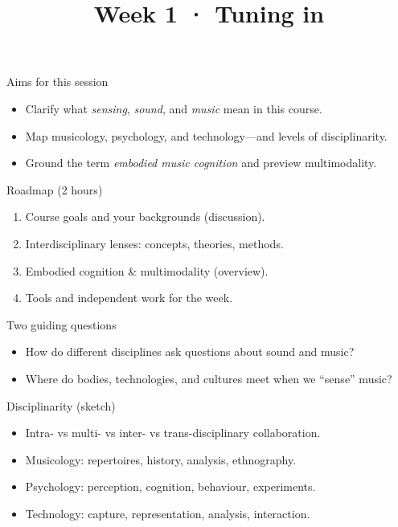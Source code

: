 \documentclass[aspectratio=169]{beamer}
\title{Week 1 · Tuning in}
\subtitle{\coursename}
\author{}
\institute{\instituteuo}
\date{}
\begin{document}
\begin{frame}
  \titlepage
\end{frame}

\begin{frame}{Aims for this session}
  \begin{itemize}
    \item Clarify what \emph{sensing}, \emph{sound}, and \emph{music} mean in this course.
    \item Map musicology, psychology, and technology—and levels of disciplinarity.
    \item Ground the term \emph{embodied music cognition} and preview multimodality.
  \end{itemize}
\end{frame}

\begin{frame}{Roadmap (2 hours)}
  \begin{enumerate}
    \item Course goals and your backgrounds (discussion).
    \item Interdisciplinary lenses: concepts, theories, methods.
    \item Embodied cognition \& multimodality (overview).
    \item Tools and independent work for the week.
  \end{enumerate}
\end{frame}

\begin{frame}{Two guiding questions}
  \begin{itemize}
    \item How do different disciplines ask questions about sound and music?
    \item Where do bodies, technologies, and cultures meet when we ``sense'' music?
  \end{itemize}
\end{frame}

\begin{frame}{Disciplinarity (sketch)}
  \begin{itemize}
    \item Intra- vs multi- vs inter- vs trans-disciplinary collaboration.
    \item Musicology: repertoires, history, analysis, ethnography.
    \item Psychology: perception, cognition, behaviour, experiments.
    \item Technology: capture, representation, analysis, interaction.
  \end{itemize}
\end{frame}
\end{document}

